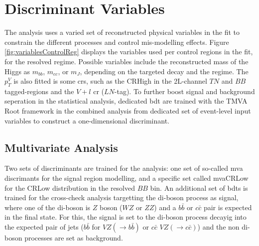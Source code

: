 \section{Discriminant Variables}
The analysis uses a varied set of reconstructed physical variables in the fit to constrain the different processes and control mis-modelling effects. Figure \ref{fig:variablesControlReg} displays the variables used per control regions in the fit, for the resolved regime. Possible variables include the reconstructed mass of the Higgs as $m_{bb}$, $m_{cc}$, or $m_J$, depending on the targeted decay and the regime. The $p_T^V$ is also fitted is some \gls{cr}s, such as the CRHigh in the 2L-channel $TN$ and $BB$ tagged-regions and the $V+l$ \gls{cr} ($LN$-tag). To further boost signal and background seperation in the statistical analysis, dedicated \gls{bdt} are trained with the \textsc{TMVA} Root framework \cite{Therhaag:2011jh} in the combined analysis from dedicated set of event-level input variables to construct a one-dimensional discriminant. \\

\subsection{Multivariate Analysis}
Two sets of discriminants are trained for the analysis: one set of so-called \gls{mva} discrimants for the signal region modelling, and a specific set called mvaCRLow for the CRLow distribution in the resolved $BB$ bin. An additional set of \gls{bdt}s is trained for the cross-check analysis targetting the di-boson process as signal, where one of the di-boson is $Z$ boson ($WZ$ or $ZZ$) and a $b\bar{b}$ or $c\bar{c}$ pair is expected in the final state. For this, the signal is set to the di-boson process decayig into the expected pair of jets ($b\bar{b}$ for $VZ(\rightarrow b\bar{b})$ or $c\bar{c}$ $VZ(\rightarrow c\bar{c})$) and the non di-boson processes are set as background.

